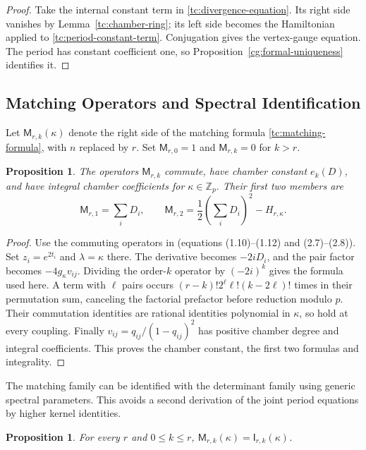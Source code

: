 \documentclass[11pt]{amsart}
\newtheorem{proposition}[theorem]{Proposition}
\theoremstyle{definition}
\theoremstyle{remark}
\numberwithin{equation}{section}
\newcommand{\Z}{\mathbb Z}
\begin{document}
\begin{proof}
Take the internal constant term in
\eqref{tc:divergence-equation}. Its right side vanishes by
Lemma~\ref{tc:chamber-ring}; its left side becomes the
Hamiltonian applied to \eqref{tc:period-constant-term}.
Conjugation gives the vertex-gauge equation. The period has
constant coefficient one, so
Proposition~\ref{cg:formal-uniqueness} identifies it.
\end{proof}

\subsection{Matching Operators and Spectral Identification}
Let $\mathsf M_{r,k}(\kappa)$ denote the right side of the
matching formula \eqref{tc:matching-formula}, with $n$ replaced
by $r$. Set $\mathsf M_{r,0}=1$ and
$\mathsf M_{r,k}=0$ for $k>r$.

\begin{proposition}\label{tc:matching}
The operators $\mathsf M_{r,k}$ commute, have chamber constant
$e_k(D)$, and have integral chamber coefficients for
$\kappa\in\Z_p$. Their first two members are
\[
 \mathsf M_{r,1}=\sum_iD_i,\qquad
 \mathsf M_{r,2}=\frac12\left(\sum_iD_i\right)^2-H_{r,\kappa}.
\]
\end{proposition}

\begin{proof}
Use the commuting operators in \cite{HR15} (equations
(1.10)--(1.12) and (2.7)--(2.8)). Set $z_i=e^{2t_i}$ and
$\lambda=\kappa$ there. The derivative becomes $-2iD_i$,
and the pair factor becomes $-4g_\kappa v_{ij}$.
Dividing the order-$k$ operator by $(-2i)^k$ gives the formula
used here. A term with $\ell$ pairs occurs
$(r-k)!2^\ell\ell!(k-2\ell)!$ times in their permutation
sum, canceling the factorial prefactor before reduction modulo
$p$. Their commutation identities are rational identities
polynomial in $\kappa$, so hold at every coupling.
Finally $v_{ij}=q_{ij}/(1-q_{ij})^2$ has positive chamber
degree and integral coefficients. This proves the chamber
constant, the first two formulas and integrality.
\end{proof}

The matching family can be identified with the determinant
family using generic spectral parameters. This avoids a second
derivation of the joint period equations by higher kernel identities.

\begin{proposition}\label{tc:matching-identification}
For every $r$ and $0\leq k\leq r$,
$\mathsf M_{r,k}(\kappa)=\mathsf I_{r,k}(\kappa)$.
\end{proposition}
\end{document}
